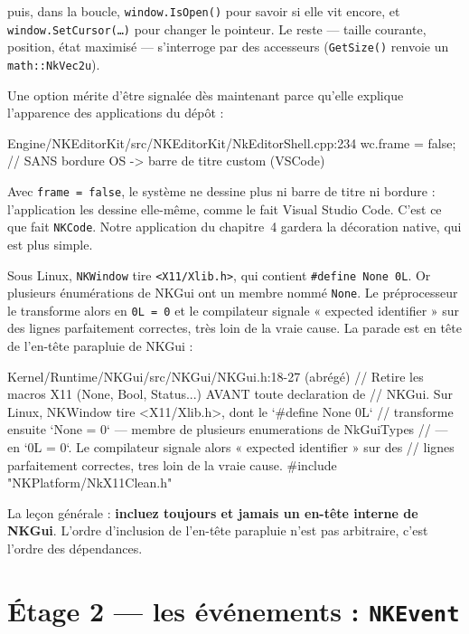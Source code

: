 \noindent puis, dans la boucle, \texttt{window.IsOpen()} pour savoir si elle vit
encore, et \texttt{window.SetCursor(\dots)} pour changer le pointeur. Le reste —
taille courante, position, état maximisé — s'interroge par des accesseurs
(\texttt{GetSize()} renvoie un \texttt{math::NkVec2u}).

Une option mérite d'être signalée dès maintenant parce qu'elle explique
l'apparence des applications du dépôt :

\begin{nkcode}{Engine/NKEditorKit/src/NKEditorKit/NkEditorShell.cpp:234}
    wc.frame = false;          // SANS bordure OS -> barre de titre custom (VSCode)
\end{nkcode}

Avec \texttt{frame = false}, le système ne dessine plus ni barre de titre ni
bordure : l'application les dessine elle-même, comme le fait Visual Studio Code.
C'est ce que fait \texttt{NKCode}. Notre application du chapitre~4 gardera la
décoration native, qui est plus simple.

\begin{nkpiege}
Sous Linux, \texttt{NKWindow} tire \texttt{<X11/Xlib.h>}, qui contient
\texttt{\#define None 0L}. Or plusieurs énumérations de NKGui ont un membre
nommé \texttt{None}. Le préprocesseur le transforme alors en \texttt{0L = 0} et
le compilateur signale « expected identifier » sur des lignes parfaitement
correctes, très loin de la vraie cause. La parade est en tête de l'en-tête
parapluie de NKGui :

\begin{nkcode}{Kernel/Runtime/NKGui/src/NKGui/NKGui.h:18-27 (abrégé)}
// Retire les macros X11 (None, Bool, Status...) AVANT toute declaration de
// NKGui. Sur Linux, NKWindow tire <X11/Xlib.h>, dont le `#define None 0L`
// transforme ensuite `None = 0` — membre de plusieurs enumerations de NkGuiTypes
// — en `0L = 0`. Le compilateur signale alors « expected identifier » sur des
// lignes parfaitement correctes, tres loin de la vraie cause.
#include "NKPlatform/NkX11Clean.h"
\end{nkcode}

La leçon générale : \textbf{incluez toujours  et jamais un
en-tête interne de NKGui}. L'ordre d'inclusion de l'en-tête parapluie n'est pas
arbitraire, c'est l'ordre des dépendances.
\end{nkpiege}

\section{Étage 2 — les événements : \texttt{NKEvent}}

